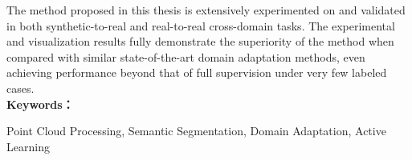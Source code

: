 The method proposed in this thesis is extensively experimented on and validated in both synthetic-to-real and real-to-real cross-domain tasks. The experimental and visualization results fully demonstrate the superiority of the method when compared with similar state-of-the-art domain adaptation methods, even achieving performance beyond that of full supervision under very few labeled cases.\\

\noindent\textbf{Keywords：} 
\begin{minipage}[t]{0.85\linewidth}
	Point Cloud Processing, Semantic Segmentation,  Domain Adaptation, Active Learning
\end{minipage}

\clearpage